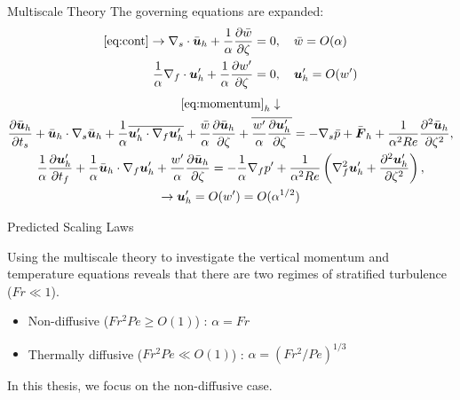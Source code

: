 \documentclass{beamer}
\begin{document}
\begin{frame}{Multiscale Theory \citep{Chinial2022}}
    The governing equations are expanded:
    {\scriptsize
    \begin{align*}
        \eqref{eq:cont} \to \nabla_s \cdot \bar{\boldsymbol{u}}_h + \frac{1}{\alpha} \frac{\partial \bar{w}}{\partial \zeta} &= 0, \quad \bar{w} = O(\alpha)\\
        \frac{1}{\alpha}\nabla_f \cdot \boldsymbol{u}_h' + \frac{1}{\alpha} \frac{\partial w'}{\partial \zeta} &= 0, \quad \boldsymbol{u}_h' = O(w')
    \end{align*}
    \begin{gather*}
        \eqref{eq:momentum}_h \downarrow\\
    \frac{\partial \bar{\boldsymbol{u}}_h}{\partial t_s} + \bar{\boldsymbol{u}}_h\cdot \nabla_s\bar{\boldsymbol{u}}_h
    + \frac{1}{\alpha}\overline{\boldsymbol{u}_h'\cdot\nabla_f\boldsymbol{u}_h'}
    + \frac{\bar{w}}{\alpha}\frac{\partial \bar{\boldsymbol{u}}_h}{\partial \zeta} 
    + \overline{\frac{w'}{\alpha}\frac{\partial \boldsymbol{u}_h'}{\partial \zeta}}
    = -\nabla_s\bar{p} + \bar{\boldsymbol{F}}_h + \frac{1}{\alpha^2Re}\frac{\partial^2 \bar{\boldsymbol{u}}_h}{\partial \zeta^2},\label{eq:horiz_mom_mean} \\
    \frac{1}{\alpha}\frac{\partial \boldsymbol{u}_h'}{\partial t_f} 
    + \frac{1}{\alpha}\bar{\boldsymbol{u}}_h\cdot\nabla_f\boldsymbol{u}_h'
    + \frac{w'}{\alpha}\frac{\partial \bar{\boldsymbol{u}}_h}{\partial \zeta} 
    = -\frac{1}{\alpha}\nabla_f p' + \frac{1}{\alpha^2Re}\left( \nabla_f^2\boldsymbol{u}_h' + \frac{\partial^2 \boldsymbol{u}_h'}{\partial \zeta^2}\right), \label{eq:horiz_mom_perturbation}\\
    \to \boldsymbol{u}_h' = O(w') = O(\alpha^{1/2})
    \end{gather*}
    }
\end{frame}

\begin{frame}{Predicted Scaling Laws}

Using the multiscale theory to investigate the vertical momentum and temperature equations reveals that there are two regimes of stratified turbulence ($Fr \ll 1$). 

\vspace{10pt} 

\begin{itemize}
\item Non-diffusive ($Fr^2Pe \ge O(1)$) \citep{Chinial2022}: $\alpha = Fr$
\item Thermally diffusive ($Fr^2Pe \ll O(1)$) \citep{Shah2023}: $\alpha = (Fr^2/Pe)^{1/3}$
\end{itemize}

In this thesis, we focus on the non-diffusive case.
\end{frame}
\end{document}
